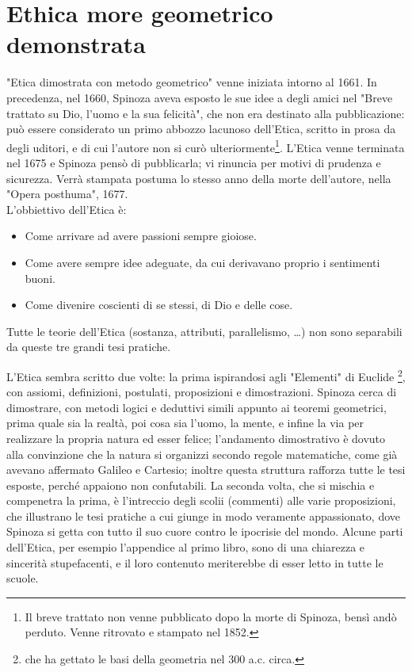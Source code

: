 \chapter[Etica]{Ethica more geometrico demonstrata}
\bigskip
"Etica dimostrata con metodo geometrico" venne iniziata intorno al 1661. In precedenza, nel 1660, Spinoza aveva esposto le sue idee a degli amici nel "Breve trattato su Dio, l'uomo e la sua felicità", che non era destinato alla pubblicazione: può essere considerato un primo abbozzo lacunoso dell'Etica, scritto in prosa da degli uditori, e di cui l'autore non si curò ulteriormente\footnote{Il breve trattato non venne pubblicato dopo la morte di Spinoza, bensì andò perduto. Venne ritrovato e stampato nel 1852.}. L'Etica venne terminata nel 1675 e Spinoza pensò di pubblicarla; vi rinuncia per motivi di prudenza e sicurezza. Verrà stampata postuma lo stesso anno della morte dell'autore, nella "Opera posthuma", 1677.
\\L'obbiettivo dell'Etica è:\begin{itemize}
	\item Come arrivare ad avere passioni sempre gioiose.
	\item Come avere sempre idee adeguate, da cui derivavano proprio i sentimenti buoni.
	\item Come divenire coscienti di se stessi, di Dio e delle cose.
\end{itemize}

Tutte le teorie dell'Etica (sostanza, attributi, parallelismo, \dots) non sono separabili da queste tre grandi tesi pratiche.

L'Etica sembra scritto due volte: la prima ispirandosi agli "Elementi" di Euclide \footnote{che ha gettato le basi della geometria nel 300 a.c. circa.}, con assiomi, definizioni, postulati, proposizioni e dimostrazioni. Spinoza cerca di dimostrare, con metodi logici e deduttivi simili appunto ai teoremi geometrici, prima quale sia la realtà, poi cosa sia l'uomo, la mente, e infine la via per realizzare la propria natura ed esser felice; l'andamento dimostrativo è dovuto alla convinzione che la natura si organizzi secondo regole matematiche, come già avevano affermato Galileo e Cartesio; inoltre questa struttura rafforza tutte le tesi esposte, perché appaiono non confutabili. La seconda volta, che si mischia e compenetra la prima, è l'intreccio degli scolii (commenti) alle varie proposizioni, che illustrano le tesi pratiche a cui giunge in modo veramente appassionato, dove Spinoza si getta con tutto il suo cuore contro le ipocrisie del mondo. Alcune parti dell'Etica, per esempio l'appendice al primo libro, sono di una chiarezza e sincerità stupefacenti, e il loro contenuto meriterebbe di esser letto in tutte le scuole.
\newpage

